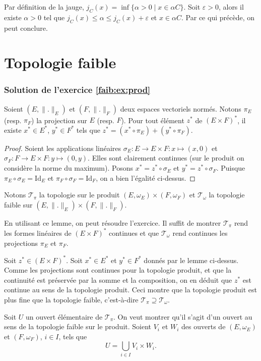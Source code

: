 Par définition de la jauge, $j_C(x)= \inf\{\alpha > 0 \mid x\in \alpha C\}$.
Soit $\varepsilon >0$, alors il existe $\alpha > 0$ tel que $j_C(x)\leq
\alpha \leq j_C(x) + \varepsilon$ et $x\in\alpha C$. Par ce qui précède,
on peut conclure.

\section{Topologie faible}
\subsubsection*{Solution de l'exercice \ref{faib:ex:prod}}
\begin{lem}
  Soient $(E, \|.\|_E)$ et $(F, \|.\|_F)$ deux espaces vectoriels normés.
  Notons $\pi_E$ (resp. $\pi_F$) la projection sur $E$ (resp. $F$).
  Pour tout élément $z^*$ de $(E\times F)^*$, il existe $x^*\in E^*$,
  $y^*\in F^*$ tels que $z^* = (x^*\circ \pi_E) + (y^*\circ\pi_F)$.
\end{lem}
\begin{proof}
  Soient les applications linéaires
  $\sigma_E:E\to E\times F: x\mapsto (x, 0)$ et
  $\sigma_F:F\to E\times F: y\mapsto (0, y)$. Elles sont clairement
  continues (sur le produit on considère la norme du maximum).
  Posons $x^* = z^*\circ \sigma_E$ et $y^* = z^*\circ \sigma_F$. Puisque
  $\pi_E\circ \sigma_E =\mathrm{Id}_E$ et  $\pi_F\circ \sigma_F =\mathrm{Id}_F$,
  on a bien l'égalité ci-dessus.
\end{proof}
Notons $\mathcal{T}_\pi$ la topologie sur le produit
$(E, \omega_E)\times(F, \omega_F)$ et $\mathcal{T}_\omega$ la topologie
faible sur $(E, \|.\|_E)\times(F, \|.\|_F)$.

En utilisant ce lemme, on peut résoudre l'exercice. Il suffit de montrer
$\mathcal{T}_\pi$ rend les formes linéaires de $(E\times F)^*$
continues et que $\mathcal{T}_\omega$ rend continues les projections
$\pi_E$ et $\pi_F$.

Soit $z^*\in(E\times F)^*$. Soit $x^*\in E^*$ et $y^*\in F^*$ donnés par
le lemme ci-dessus. Comme les projections sont continues pour la topologie
produit, et que la continuité est préservée par la somme et la composition,
on en déduit que $z^*$ est continue au sens de la topologie produit. Ceci
montre que la topologie produit est plus fine que la topologie faible,
c'est-à-dire $\mathcal{T}_\pi\supseteq \mathcal{T}_\omega$.

Soit $U$ un ouvert élémentaire de $\mathcal{T}_\pi$.
On veut montrer qu'il s'agit d'un ouvert au sens de la topologie faible
sur le produit. Soient $V_i$ et $W_i$ des ouverts de $(E, \omega_E)$ et
$(F, \omega_F)$, $i\in I$, tels que
$$U=\bigcup_{i\in I} V_i\times W_i.$$

